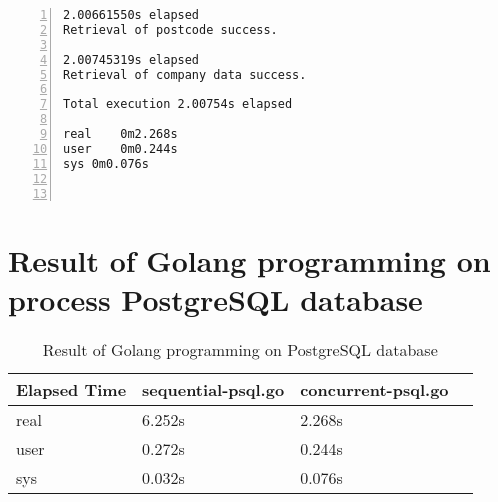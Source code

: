 \begin{lstlisting}[breaklines, frame=single, numbers=left, caption={Linux command for Go program execution}, label=commandline-02]
2.00661550s elapsed
Retrieval of postcode success.

2.00745319s elapsed
Retrieval of company data success.

Total execution 2.00754s elapsed

real	0m2.268s
user	0m0.244s
sys	0m0.076s



\end{lstlisting}

\section{Result of Golang programming on process PostgreSQL database}

\begin{table}[H]
	\centering
	\begin{tabulary}{1.0\textwidth}{|L|L|L|L}
		\hline
		{\bf Elapsed Time} & {\bf sequential-psql.go}  & {\bf concurrent-psql.go} \\ \hline
		real      & 6.252s                    &  2.268s                  \\ \hline
		user     & 0.272s                    &  0.244s                  \\ \hline
		sys       & 0.032s                    &  0.076s                  \\ \hline
	\end{tabulary}
	\caption{Result of Golang programming on PostgreSQL database}
\end{table}





